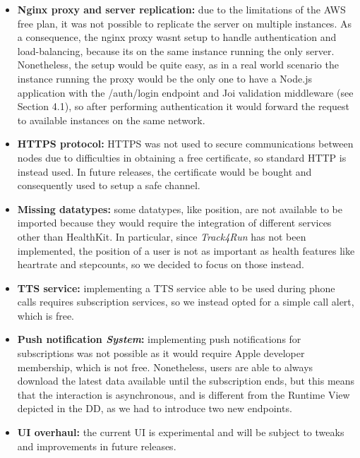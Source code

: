 \documentclass[titlepage]{article}
\begin{document}
	\begin{itemize}
		\item {\bf Nginx proxy and server replication:}
		due to the limitations of the AWS free plan, it was not possible to replicate the server on multiple instances. As a consequence, the nginx proxy wasn\textsc{}t setup to handle authentication and load-balancing, because it\textsc{}s on the same instance running the only server. Nonetheless, the setup would be quite easy, as in a real world scenario the instance running the proxy would be the only one to have a Node.js application with the /auth/login endpoint and Joi validation middleware (see Section 4.1), so after performing authentication it would forward the request to available instances on the same network.
		
		\item {\bf HTTPS protocol:}
		HTTPS was not used to secure communications between nodes due to difficulties in obtaining a free certificate, so standard HTTP is instead used. In future releases, the certificate would be bought and consequently used to setup a safe channel.
		
		\item{\bf Missing datatypes:}
		some datatypes, like position, are not available to be imported because they would require the integration of different services other than HealthKit. In particular, since {\it {\it Track4Run}} has not been implemented, the position of a user is not as important as health features like heartrate and stepcounts, so we decided to focus on those instead.
		
		\item {\bf TTS service:}
		implementing a TTS service able to be used during phone calls requires subscription services, so we instead opted for a simple call alert, which is free.
		
		\item {\bf Push notification {\it System}:}
		implementing push notifications for subscriptions was not possible as it would require Apple developer membership, which is not free. Nonetheless, users are able to always download the latest data available until the subscription ends, but this means that the interaction is asynchronous, and is different from the Runtime View depicted in the DD, as we had to introduce two new endpoints.
		
		\item {\bf UI overhaul:} 
		the current UI is experimental and will be subject to tweaks and improvements in future releases.
		
	\end{itemize}
	
\end{document}
